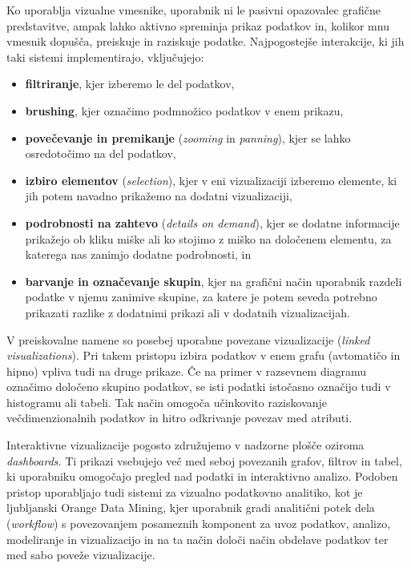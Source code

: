 Ko uporablja vizualne vmesnike, uporabnik ni le pasivni opazovalec grafične predstavitve, ampak lahko aktivno spreminja prikaz podatkov in, kolikor mnu vmesnik dopušča, preiskuje in raziskuje podatke. Najpogostejše interakcije, ki jih taki sistemi implementirajo, vključujejo:
\begin{itemize}
    \item \textbf{filtriranje}, kjer izberemo le del podatkov,
    \item \textbf{brushing}, kjer označimo podmnožico podatkov v enem prikazu,
    \item \textbf{povečevanje in premikanje} (\emph{zooming} in \emph{panning}), kjer se lahko osredotočimo na del podatkov,
    \item \textbf{izbiro elementov} (\emph{selection}), kjer v eni vizualizaciji izberemo elemente, ki jih potem navadno prikažemo na dodatni vizualizaciji,
    \item \textbf{podrobnosti na zahtevo} (\emph{details on demand}), kjer se dodatne informacije prikažejo ob kliku miške ali ko stojimo z miško na določenem elementu, za katerega nas zanimjo dodatne podrobnosti, in
    \item \textbf{barvanje in označevanje skupin}, kjer na grafični način uporabnik razdeli podatke v njemu zanimive skupine, za katere je potem seveda potrebno prikazati razlike z dodatnimi prikazi ali v dodatnih vizualizacijah.
\end{itemize}

V preiskovalne namene so posebej uporabne povezane vizualizacije (\emph{linked visualizations}). Pri takem pristopu izbira podatkov v enem grafu (avtomatičo in hipno) vpliva tudi na druge prikaze. Če na primer v razsevnem diagramu označimo določeno skupino podatkov, se isti podatki istočasno označijo tudi v histogramu ali tabeli. Tak način omogoča učinkovito raziskovanje večdimenzionalnih podatkov in hitro odkrivanje povezav med atributi.

Interaktivne vizualizacije pogosto združujemo v nadzorne plošče oziroma \emph{dashboards}. Ti prikazi vsebujejo več med seboj povezanih grafov, filtrov in tabel, ki uporabniku omogočajo pregled nad podatki in interaktivno analizo. Podoben pristop uporabljajo tudi sistemi za vizualno podatkovno analitiko, kot je ljubljanski Orange Data Mining, kjer uporabnik gradi analitični potek dela (\emph{workflow}) s povezovanjem posameznih komponent za uvoz podatkov, analizo, modeliranje in vizualizacijo in na ta način določi način obdelave podatkov ter med sabo poveže vizualizacije.

